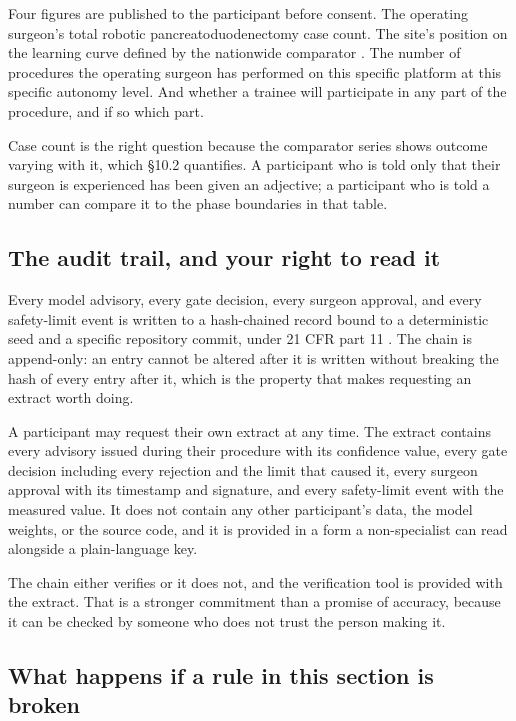 Four figures are published to the participant before consent. The operating
surgeon's total robotic pancreatoduodenectomy case count. The site's position on
the learning curve defined by the nationwide comparator \cite{DutchCohort2025}.
The number of procedures the operating surgeon has performed on this specific
platform at this specific autonomy level. And whether a trainee will participate
in any part of the procedure, and if so which part.

Case count is the right question because the comparator series shows outcome
varying with it, which \S 10.2 quantifies. A participant who is told only that
their surgeon is experienced has been given an adjective; a participant who is
told a number can compare it to the phase boundaries in that table.

\subsection{The audit trail, and your right to read it}

Every model advisory, every gate decision, every surgeon approval, and every
safety-limit event is written to a hash-chained record bound to a deterministic
seed and a specific repository commit, under 21 CFR part 11
\cite{ecfr2026part11, cfr312paiuni}. The chain is append-only: an entry cannot
be altered after it is written without breaking the hash of every entry after
it, which is the property that makes requesting an extract worth doing.

A participant may request their own extract at any time. The extract contains
every advisory issued during their procedure with its confidence value, every
gate decision including every rejection and the limit that caused it, every
surgeon approval with its timestamp and signature, and every safety-limit event
with the measured value. It does not contain any other participant's data, the
model weights, or the source code, and it is provided in a form a
non-specialist can read alongside a plain-language key.

The chain either verifies or it does not, and the verification tool is provided
with the extract. That is a stronger commitment than a promise of accuracy,
because it can be checked by someone who does not trust the person making it.

\subsection{What happens if a rule in this section is broken}

